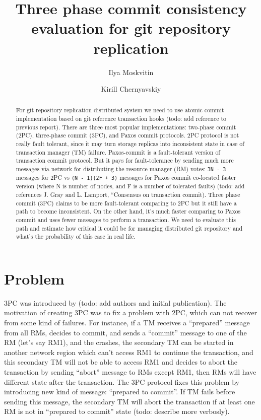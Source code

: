 \documentclass[acmlarge, screen, nonacm]{acmart}
\title{Three phase commit consistency evaluation for git repository replication}
\author{Ilya Moskvitin}
\author{Kirill Chernyavskiy}
\begin{document}
\begin{abstract}
  For git repository replication distributed system we need to use atomic
  commit implementation based on git reference transaction hooks (todo: add reference to previous report).
  There are three most popular implementations: two-phase commit (2PC), three-phase commit (3PC),
  and Paxos commit protocols. 2PC protocol is not really fault tolerant, since it may turn storage
  replicas into inconsistent state in case of transaction manager (TM) failure. Paxos-commit is a fault-tolerant
  version of transaction commit protocol. But it pays for fault-tolerance by sending much more messages via network
  for distributing the resource manager (RM) votes: \texttt{3N - 3} messages for 2PC vs
  \texttt{(N - 1)(2F + 3)} messages for Paxos commit co-located faster version (where N is number of nodes,
  and F is a number of tolerated faults)
  (todo: add references  J. Gray and L. Lamport, “Consensus on transaction commit).
  Three phase commit (3PC) claims to be more fault-tolerant comparing to 2PC but it still have a path to become
  inconsistent. On the other hand, it's much faster comparing to Paxos commit and uses fewer messages to perform a
  transaction. We need to evaluate this path and estimate how critical it could be for managing distributed
  git repository and what's the probability of this case in real life.
\end{abstract}

\maketitle

\section{Problem}

3PC was introduced by (todo: add authors and initial publication). The motivation of creating 3PC was to fix
a problem with 2PC, which can not recover from some kind of failures. For instance, if a TM receives a ``prepared''
message from all RMs, decides to commit, and sends a ``commit'' message to one of the RM (let's say RM1),
and the crashes, the secondary TM can be started in another network region which can't access RM1 to continue the transaction,
and this secondary TM will not be able to access RM1 and decides to abort the transaction by sending ``abort'' message
to RMs except RM1, then RMs will have different state after the transaction.
The 3PC protocol fixes this problem by introducing new kind of message: ``prepared to commit''. If TM fails before sending
this message, the secondary TM will abort the transaction if at least one RM is not in ``prepared to commit'' state
(todo: describe more verbosly).
\end{document}
